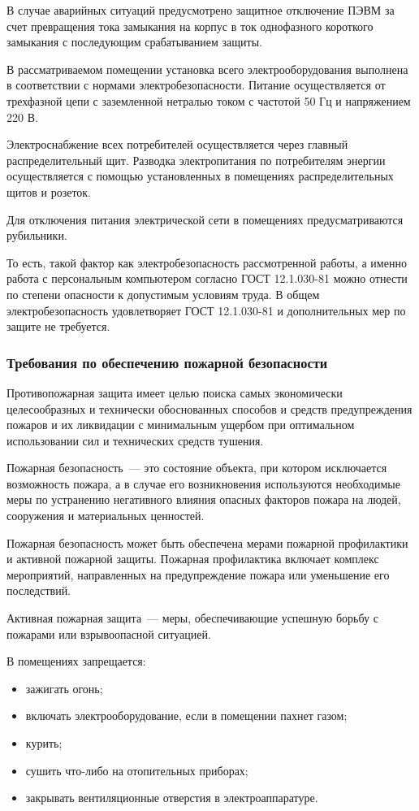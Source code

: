 В случае аварийных ситуаций предусмотрено защитное отключение ПЭВМ за счет превращения тока замыкания на корпус в ток однофазного короткого замыкания с последующим срабатыванием защиты.

В рассматриваемом помещении установка всего электрооборудования выполнена в соответствии с нормами электробезопасности.
Питание осуществляется от трехфазной цепи с заземленной нетралью током с частотой 50 Гц и напряжением 220 В.

Электроснабжение всех потребителей осуществляется через главный распределительный щит.
Разводка электропитания по потребителям энергии осуществляется с помощью установленных в помещениях распределительных щитов и розеток.

Для отключения питания электрической сети в помещениях предусматриваются рубильники.

То есть, такой фактор как электробезопасность рассмотренной работы, а именно работа с персональным компьютером согласно ГОСТ 12.1.030-81 можно отнести по степени опасности к допустимым условиям труда.
В общем электробезопасность удовлетворяет ГОСТ 12.1.030-81 и дополнительных мер по защите не требуется.

\subsubsection{Требования по обеспечению пожарной безопасности}

Противопожарная защита имеет целью поиска самых экономически целесообразных и технически обоснованных способов и средств предупреждения пожаров и их ликвидации с минимальным ущербом при оптимальном использовании сил и технических средств тушения.

Пожарная безопасность~--- это состояние объекта, при котором исключается возможность пожара, а в случае его возникновения используются необходимые меры по устранению негативного влияния опасных факторов пожара на людей, сооружения и материальных ценностей.

Пожарная безопасность может быть обеспечена мерами пожарной профилактики и активной пожарной защиты.
Пожарная профилактика включает комплекс мероприятий, направленных на предупреждение пожара или уменьшение его последствий.

Активная пожарная защита~--- меры, обеспечивающие успешную борьбу с пожарами или взрывоопасной ситуацией.

В помещениях запрещается:
\begin{itemize}
  \item зажигать огонь;
  \item включать электрооборудование, если в помещении пахнет газом;
  \item курить;
  \item сушить что-либо на отопительных приборах;
  \item закрывать вентиляционные отверстия в электроаппаратуре.
\end{itemize}

